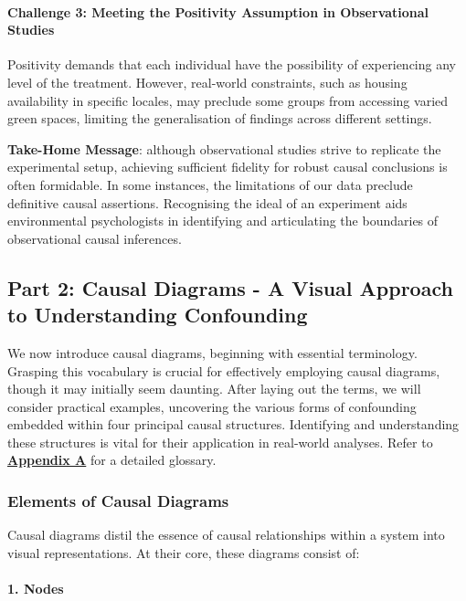 \documentclass[
  singlecolumn]{article}
\let\oldparagraph\paragraph
\renewcommand{\paragraph}[1]{\oldparagraph{#1}\mbox{}}
\begin{document}
\paragraph{Challenge 3: Meeting the Positivity Assumption in
Observational
Studies}\label{challenge-3-meeting-the-positivity-assumption-in-observational-studies}

Positivity demands that each individual have the possibility of
experiencing any level of the treatment. However, real-world
constraints, such as housing availability in specific locales, may
preclude some groups from accessing varied green spaces, limiting the
generalisation of findings across different settings.

\textbf{Take-Home Message}: although observational studies strive to
replicate the experimental setup, achieving sufficient fidelity for
robust causal conclusions is often formidable. In some instances, the
limitations of our data preclude definitive causal assertions.
Recognising the ideal of an experiment aids environmental psychologists
in identifying and articulating the boundaries of observational causal
inferences.

\subsection{Part 2: Causal Diagrams - A Visual Approach to Understanding
Confounding}\label{part-2-causal-diagrams---a-visual-approach-to-understanding-confounding}

We now introduce causal diagrams, beginning with essential terminology.
Grasping this vocabulary is crucial for effectively employing causal
diagrams, though it may initially seem daunting. After laying out the
terms, we will consider practical examples, uncovering the various forms
of confounding embedded within four principal causal structures.
Identifying and understanding these structures is vital for their
application in real-world analyses. Refer to
\hyperref[appendix-a]{\textbf{Appendix A}} for a detailed glossary.

\subsubsection{Elements of Causal
Diagrams}\label{elements-of-causal-diagrams}

Causal diagrams distil the essence of causal relationships within a
system into visual representations. At their core, these diagrams
consist of:

\paragraph{\texorpdfstring{1. \textbf{Nodes}}{1. Nodes}}\label{nodes}
\end{document}
